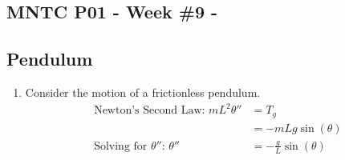 


\usepackage{bbding} %


\newcommand{\ub}{\underbrace}

\begin{center}
\subsection*{MNTC P01 - Week \#9 - \WeekTitleNine}
\end{center}


\subsection*{Pendulum}
\begin{enumerate}[1.]

\item 
  \begin{Question}
    \begin{minipage}[h]{0.6\linewidth}
\vspace{0pt}
Consider the motion of a frictionless pendulum.
\begin{align*}
  \mbox{Newton's Second Law: }   m  L^2 \theta'' & = T_g \\
  & = - m L g \sin(\theta)  \\
  \mbox{Solving for $\theta''$: }\theta'' & = - \frac{g}{L} \sin(\theta) 
\end{align*}


\end{minipage}
\end{Question}
\end{enumerate}
